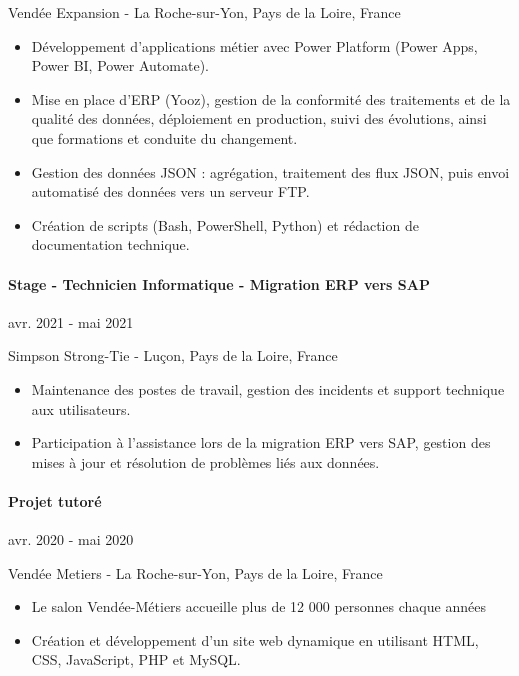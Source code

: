\documentclass{article}
\begin{document}
\noindent
Vendée Expansion - La Roche-sur-Yon, Pays de la Loire, France

\raggedright
\begin{itemize}
  \item Développement d'applications métier avec Power Platform (Power Apps, Power BI, Power Automate).
  \item Mise en place d'ERP (Yooz), gestion de la conformité des traitements et de la qualité des données, déploiement en production, suivi des évolutions, ainsi que formations et conduite du changement.
  \item Gestion des données JSON : agrégation, traitement des flux JSON, puis envoi automatisé des données vers un serveur FTP.
  \item Création de scripts (Bash, PowerShell, Python) et rédaction de documentation technique.
\end{itemize}


\paragraph{Stage - Technicien Informatique - Migration ERP vers SAP}\hspace*{\fill}avr. 2021 - mai 2021

\noindent
Simpson Strong-Tie - Luçon, Pays de la Loire, France

\raggedright  
\begin{itemize}
  \item{Maintenance des postes de travail, gestion des incidents et support technique aux utilisateurs.}
  \item{Participation à l'assistance lors de la migration ERP vers SAP, gestion des mises à jour et résolution de problèmes liés aux données.}
\end{itemize}

\paragraph{Projet tutoré}\hspace*{\fill}avr. 2020 - mai 2020

\noindent
Vendée Metiers - La Roche-sur-Yon, Pays de la Loire, France

\raggedright  
\begin{itemize}
  \item{Le salon Vendée-Métiers accueille plus de 12 000 personnes chaque années}
  \item{Création et développement d'un site web dynamique en utilisant HTML, CSS, JavaScript, PHP et MySQL.}
\end{itemize}
\end{document}
